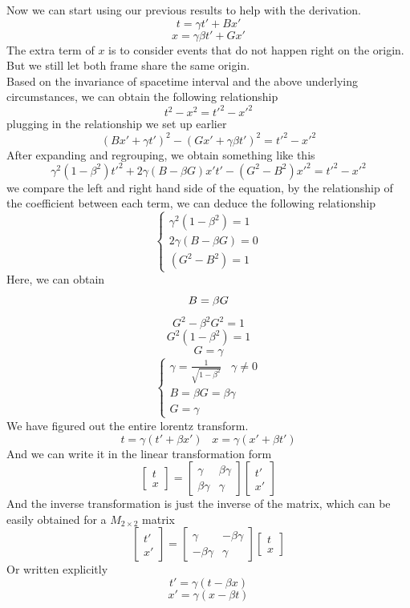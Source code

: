 \documentclass[12pt]{book}
\begin{document}
Now we can start using our previous results to help with the derivation. 
\[
t = \gamma t' + Bx'
\]
\[
x=\gamma \beta t' + Gx' 
\]
The extra term of $x$ is to consider events that do not happen right on the origin. But we still let both frame share the same origin.\\
\newline
Based on the invariance of spacetime interval and the above underlying circumstances, we can obtain the following relationship
\[
t^2 - x^2 = t'^2 - x'^2
\]
plugging in the relationship we set up earlier
\[
(Bx'+\gamma t')^2 - (Gx' + \gamma \beta t')^2 = t'^2 - x'^2
\]
After expanding and regrouping, we obtain something like this
\[
\gamma^2(1-\beta^2)t'^2 +2\gamma(B-\beta G)x't' - (G^2 - B^2)x'^2 = t'^2 - x'^2
\]
we compare the left and right hand side of the equation, by the relationship of the coefficient between each term, we can deduce the following relationship
\[
\begin{cases}
    \gamma^2(1-\beta^2)=1\\
    2\gamma(B-\beta G)=0\\
    (G^2-B^2)=1
\end{cases}
\]
Here, we can obtain
\[
B=\beta G\\
\]
\[
G^2 - \beta ^2 G^2 = 1
\]
\[
G^2(1-\beta ^2 ) = 1
\]
\[
G = \gamma
\]
\[
\begin{cases}
    \gamma = \frac{1}{\sqrt{1-\beta^2}} \;\;\; \gamma \neq 0\\
    B=\beta G = \beta \gamma \\ 
    G = \gamma
\end{cases}
\]
We have figured out the entire lorentz transform.
\[
t = \gamma (t'+\beta x') \;\;\;
x = \gamma (x'+\beta t')
\]
And we can write it in the linear transformation form
\[
\begin{bmatrix}
    t \\ x
\end{bmatrix}
=
\begin{bmatrix}
    \gamma      &   \beta\gamma   \\
    \beta\gamma &   \gamma
\end{bmatrix}
\begin{bmatrix}
    t'\\ x'
\end{bmatrix}
\]
And the inverse transformation is just the inverse of the matrix, which can be easily obtained for a $M_{2 \times 2}$ matrix
\[
\begin{bmatrix}
    t' \\ x'
\end{bmatrix}
=
\begin{bmatrix}
    \gamma      &   -\beta\gamma   \\
    -\beta\gamma &   \gamma
\end{bmatrix}
\begin{bmatrix}
    t\\ x
\end{bmatrix}
\]
Or written explicitly
\[
t' = \gamma(t-\beta x)
\]
\[
x' = \gamma (x-\beta t)
\]
\end{document}
